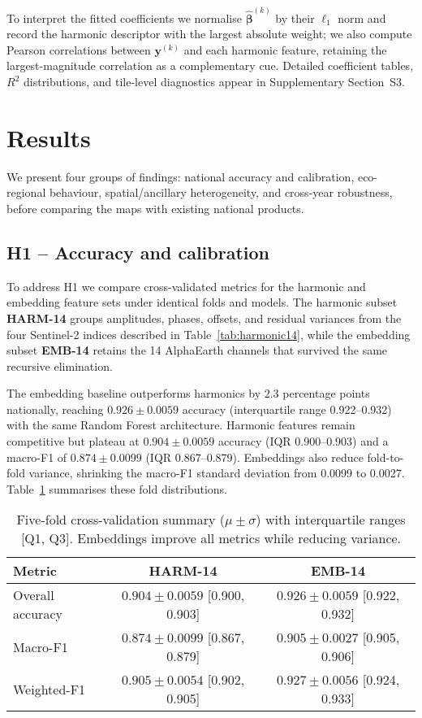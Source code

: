 \documentclass[utf8]{FrontiersinHarvard}
\begin{document}
To interpret the fitted coefficients we normalise \(\hat{\boldsymbol{\beta}}^{(k)}\) by their $\ell_1$ norm and record the harmonic descriptor with the largest absolute weight; we also compute Pearson correlations between \(\mathbf{y}^{(k)}\) and each harmonic feature, retaining the largest-magnitude correlation as a complementary cue. Detailed coefficient tables, $R^2$ distributions, and tile-level diagnostics appear in Supplementary Section~S3.

\section{Results}
\label{sec:results}
We present four groups of findings: national accuracy and calibration, eco-regional behaviour, spatial/ancillary heterogeneity, and cross-year robustness, before comparing the maps with existing national products.
\subsection{H1 -- Accuracy and calibration}
To address H1 we compare cross-validated metrics for the harmonic and embedding feature sets under identical folds and models. The harmonic subset \textbf{HARM-14} groups amplitudes, phases, offsets, and residual variances from the four Sentinel-2 indices described in Table~\ref{tab:harmonic14}, while the embedding subset \textbf{EMB-14} retains the 14 AlphaEarth channels that survived the same recursive elimination.

The embedding baseline outperforms harmonics by \(2.3\) percentage points nationally, reaching \(0.926 \pm 0.0059\) accuracy (interquartile range 0.922–0.932) with the same Random Forest architecture. Harmonic features remain competitive but plateau at \(0.904 \pm 0.0059\) accuracy (IQR 0.900–0.903) and a macro-F1 of \(0.874 \pm 0.0099\) (IQR 0.867–0.879). Embeddings also reduce fold-to-fold variance, shrinking the macro-F1 standard deviation from 0.0099 to 0.0027. Table~\ref{tab:cv_summary} summarises these fold distributions.
\begin{table}[H]
    \centering
    \small
    \begin{tabular}{lcc}
        \toprule
        \textbf{Metric} & \textbf{HARM-14} & \textbf{EMB-14} \\
        \midrule
        Overall accuracy & \(0.904 \pm 0.0059\) [0.900, 0.903] & \(0.926 \pm 0.0059\) [0.922, 0.932] \\
        Macro-F1 & \(0.874 \pm 0.0099\) [0.867, 0.879] & \(0.905 \pm 0.0027\) [0.905, 0.906] \\
        Weighted-F1 & \(0.905 \pm 0.0054\) [0.902, 0.905] & \(0.927 \pm 0.0056\) [0.924, 0.933] \\
        \bottomrule
    \end{tabular}
    \caption{Five-fold cross-validation summary (\( \mu \pm \sigma\)) with interquartile ranges [Q1, Q3]. Embeddings improve all metrics while reducing variance.}
    \label{tab:cv_summary}
\end{table}
\end{document}
